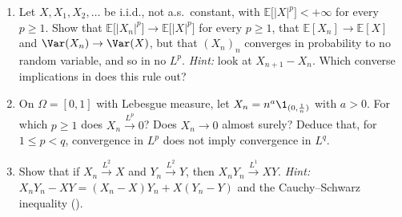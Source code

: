 
\begin{exercise}\label{ex:ll-moments}
\easy
\begin{enumerate}[label=(\alph*)]
  \item Let $X,X_1,X_2,\dots$ be i.i.d., not a.s.\ constant, with $\mathbb E\big[|X|^p\big]<+\infty$
    for every $p\ge1$. Show that $\mathbb E\big[|X_n|^p\big]\to\mathbb E\big[|X|^p\big]$ for every
    $p\ge1$, that $\mathbb E[X_n]\to\mathbb E[X]$ and $\Var(X_n)\to\Var(X)$, but that $(X_n)_n$
    converges in probability to no random variable, and so in no $L^p$. \emph{Hint:} look at
    $X_{n+1}-X_n$. Which converse implications in  does this rule out?
  \item On $\Omega=[0,1]$ with Lebesgue measure, let $X_n=n^a\1_{(0,\frac1n)}$ with $a>0$. For
    which $p\ge1$ does $X_n\xrightarrow{L^p}0$? Does $X_n\to0$ almost surely? Deduce that, for
    $1\le p<q$, convergence in $L^p$ does not imply convergence in $L^q$.
  \item Show that if $X_n\xrightarrow{L^2}X$ and $Y_n\xrightarrow{L^2}Y$, then
    $X_nY_n\xrightarrow{L^1}XY$. \emph{Hint:} $X_nY_n-XY=(X_n-X)Y_n+X(Y_n-Y)$ and the
    Cauchy--Schwarz inequality ().
\end{enumerate}
\end{exercise}

